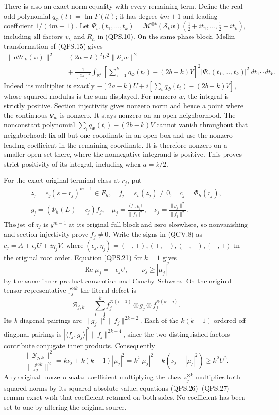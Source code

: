 There is also an exact norm equality with every remaining term.
Define the real odd polynomial \(q_\Phi(t)=\operatorname{Im}F(it)\);
it has degree \(4m+1\) and leading coefficient \(1/(4m+1)\).
Let
\(\Psi_w(t_1,\ldots,t_k)=
\mathcal M^{\otimes k}(\mathcal S_k w)
(\tfrac12+it_1,\ldots,\tfrac12+it_k)\), including all factors
\(v_h\) and \(R_h\) in (QPS.10). On the same phase block,
Mellin transformation of (QPS.15) gives
\[
 \begin{split}
 \|d\mathcal H_k(w)\|^2
   &=(2a-k)^2U^2\|\mathcal S_k w\|^2\\
   &\quad+\frac1{(2\pi)^k}\int_{\mathbb R^k}
    \left[\sum_{i=1}^kq_\Phi(t_i)-(2b-k)V\right]^2
                      |\Psi_w(t_1,\ldots,t_k)|^2\,dt_1\cdots dt_k.
 \end{split}
 \tag{QPS.23}
\]
Indeed its multiplier is exactly
\(-(2a-k)U+i[\sum_iq_\Phi(t_i)-(2b-k)V]\), whose squared
modulus is the sum displayed. For nonzero \(w\), the integral
is strictly positive. Section injectivity gives nonzero norm and
hence a point where the continuous \(\Psi_w\) is nonzero.
It stays nonzero on an open neighborhood. The nonconstant
polynomial \(\sum_iq_\Phi(t_i)-(2b-k)V\) cannot vanish throughout
that neighborhood: fix all but one coordinate in an open box
and use the nonzero leading coefficient in the remaining
coordinate. It is therefore nonzero on a smaller open set there,
where the nonnegative integrand is positive. This proves strict
positivity of its integral, including when \(a=k/2\).

For the exact original terminal class at \(r_j\), put
\[
 \begin{gathered}
 z_j=e_j(s-r_j)^{m-1}\in E_h,\quad
 f_j=s_h(z_j)\ne0,\quad
 c_j=\Phi_h(r_j),\\
 g_j=(\Phi_h(D)-c_j)f_j,\quad
 \mu_j=\frac{\langle f_j,g_j\rangle}{\|f_j\|^2},\quad
 \nu_j=\frac{\|g_j\|^2}{\|f_j\|^2}.
 \end{gathered}
 \tag{QPS.24}
\]
The jet of \(z_j\) is \(y^{m-1}\) at its original full block
and zero elsewhere, so nonvanishing and section injectivity
prove \(f_j\ne0\). Write the signs in (QCV.8) as
\(c_j=A+\epsilon_jU+i\eta_jV\), where
\((\epsilon_j,\eta_j)=(+,+),(+,-),(-,-),(-,+)\) in the original
root order. Equation (QPS.21) for \(k=1\) gives
\[
 \operatorname{Re}\mu_j=-\epsilon_jU,\qquad
 \nu_j\geq|\mu_j|^2
 \tag{QPS.25}
\]
by the same inner-product convention and Cauchy--Schwarz.
On the original tensor representative \(f_j^{\otimes k}\)
the literal defect is
\[
 \mathcal B_{j,k}
   =\sum_{i=1}^k
       f_j^{\otimes(i-1)}\otimes g_j\otimes f_j^{\otimes(k-i)}.
 \tag{QPS.26}
\]
Its \(k\) diagonal pairings are
\(\|g_j\|^2\|f_j\|^{2k-2}\). Each of the \(k(k-1)\) ordered
off-diagonal pairings is
\(|\langle f_j,g_j\rangle|^2\|f_j\|^{2k-4}\), since the two
distinguished factors contribute conjugate inner products.
Consequently
\[
 \frac{\|\mathcal B_{j,k}\|^2}{\|f_j^{\otimes k}\|^2}
   =k\nu_j+k(k-1)|\mu_j|^2
   =k^2|\mu_j|^2+k(\nu_j-|\mu_j|^2)
   \geq k^2U^2.
 \tag{QPS.27}
\]
Any original nonzero scalar coefficient multiplying the class
\(z_j^{\otimes k}\) multiplies both squared norms by its squared
absolute value; equations (QPS.26)--(QPS.27) remain exact with
that coefficient retained on both sides. No coefficient has
been set to one by altering the original source.

